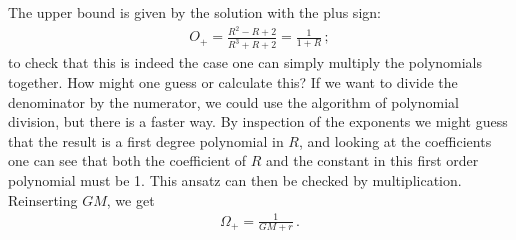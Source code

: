 \documentclass[main.tex]{subfiles}
\begin{document}
The upper bound is given by the solution with the plus sign: 
%
\begin{align}
O_{+} = \frac{R^2 - R + 2}{R^3+ R  + 2} = \frac{1}{1 + R}
\,;
\end{align}
%
to check that this is indeed the case one can simply multiply the polynomials together. 
How might one guess or calculate this? If we want to divide the denominator by the numerator, we could use the algorithm of polynomial division, but there is a faster way. By inspection of the exponents we might guess that the result is a first degree polynomial in \(R\), and looking at the coefficients one can see that both the coefficient of \(R\) and the constant in this first order polynomial must be 1. This ansatz can then be checked by multiplication. Reinserting \(GM\), we get 
%
\begin{align}
\Omega_{+} = \frac{1}{GM + r}
\,.
\end{align}
%
\end{document}
